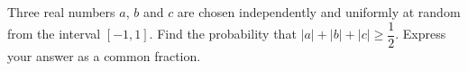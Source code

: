 Three real numbers $a$, $b$ and $c$ are chosen independently and uniformly at random from the interval $[-1,1]$. Find the probability that $|a|+|b|+|c|\ge\dfrac{1}{2}$. Express your answer as a common fraction.
